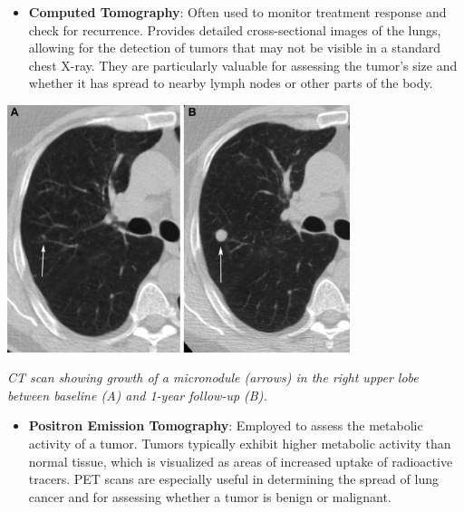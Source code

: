 \begin{itemize}
    \item \textbf{Computed Tomography}: Often used to monitor treatment response and check for 
    recurrence. Provides detailed cross-sectional images of the lungs, allowing for the detection of 
    tumors that may not be visible in a standard chest X-ray. They are particularly valuable for 
    assessing the tumor’s size and whether it has spread to nearby lymph nodes or other parts of the 
    body.
\end{itemize}

\vspace{1em}
\begin{center}
    \includegraphics[width=0.75\textwidth]{../assets/04-diagnosis/lc-ct-micronodule-growth.jpg}

    \small\textit{CT scan showing growth of a micronodule (arrows) in the right upper lobe between 
    baseline (A) and 1-year follow-up (B). \cite{MUNDEN20191538}}
\end{center}
\vspace{1em}

\begin{itemize}
    \item \textbf{Positron Emission Tomography}: Employed to assess the metabolic activity of a 
    tumor. Tumors typically exhibit higher metabolic activity than normal tissue, which is 
    visualized as areas of increased uptake of radioactive tracers. PET scans are especially useful 
    in determining the spread of lung cancer and for assessing whether a tumor is benign or 
    malignant.
\end{itemize}

